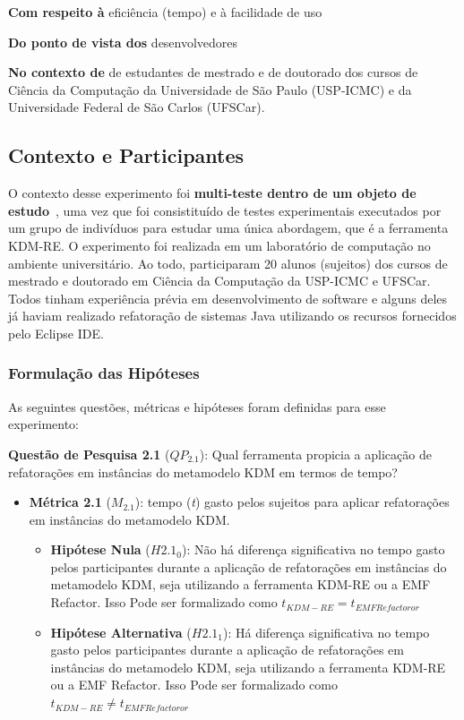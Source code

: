 \textbf{Com respeito à} eficiência (tempo) e à facilidade de uso

\textbf{Do ponto de vista dos} desenvolvedores

\textbf{No contexto de } de estudantes de mestrado e de doutorado dos cursos de Ciência da Computação da Universidade de São Paulo (USP-ICMC) e da Universidade Federal de São Carlos (UFSCar).

\subsection{Contexto e Participantes}

O contexto desse experimento foi \textbf{multi-teste dentro de um objeto de estudo}~\cite{Wohlin}, uma vez que foi consistituído de testes experimentais executados por um grupo de indivíduos para estudar uma única abordagem, que é a ferramenta KDM-RE. O experimento foi realizada em um laboratório de computação no ambiente universitário. Ao todo, participaram 20 alunos (sujeitos) dos cursos de mestrado e doutorado em Ciência da Computação da USP-ICMC e UFSCar. Todos tinham experiência prévia em desenvolvimento de software e alguns deles já haviam realizado refatoração de sistemas Java utilizando os recursos fornecidos pelo Eclipse IDE.

\subsubsection{Formulação das Hipóteses}

As seguintes questões, métricas e hipóteses foram definidas para esse experimento:

\textbf{Questão de Pesquisa 2.1} (\textbf{$QP_{2.1}$}): Qual ferramenta propicia a aplicação de refatorações em instâncias do metamodelo KDM em termos de tempo?

\begin{itemize}
\item \textbf{Métrica 2.1} (\textbf{$M_{2.1}$}): tempo (\textit{t}) gasto pelos sujeitos para aplicar refatorações em instâncias do metamodelo KDM.
\begin{itemize}
\item \textbf{Hipótese Nula} (\textbf{$H2.1_0$}): Não há diferença significativa no tempo gasto pelos participantes durante a aplicação de refatorações em instâncias do metamodelo KDM, seja utilizando a ferramenta KDM-RE ou a EMF Refactor. Isso Pode ser formalizado como $t_{KDM-RE} = t_{EMF Refactoror}$
\item \textbf{Hipótese Alternativa} (\textbf{$H2.1_1$}): Há diferença significativa no tempo gasto pelos participantes durante a aplicação de refatorações em instâncias do metamodelo KDM, seja utilizando a ferramenta KDM-RE ou a EMF Refactor. Isso Pode ser formalizado como $t_{KDM-RE} \neq t_{EMF Refactoror}$
\end{itemize}
\end{itemize}

